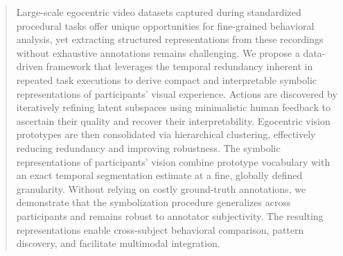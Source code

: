 \documentclass[runningheads]{llncs}
\begin{document}
%
%
%
\maketitle              %
%
\begin{abstract}
    Large-scale egocentric video datasets captured during standardized procedural tasks offer unique opportunities for fine-grained behavioral analysis, yet extracting structured representations from these recordings without exhaustive annotations remains challenging.
    We propose a data-driven framework that leverages the temporal redundancy inherent in repeated task executions to derive compact and interpretable symbolic representations of participants' visual experience. Actions are discovered by iteratively refining latent subspaces using minimalistic human feedback to ascertain their quality and recover their interpretability. Egocentric vision prototypes are then consolidated via hierarchical clustering, effectively reducing redundancy and improving robustness. The symbolic representations of participants' vision combine prototype vocabulary with an exact temporal segmentation estimate at a fine, globally defined granularity. Without relying on costly ground-truth annotations, we demonstrate that the symbolization procedure generalizes across participants and remains robust to annotator subjectivity. The resulting representations enable cross-subject behavioral comparison, pattern discovery, and facilitate multimodal integration.


\end{abstract}

\end{document}

